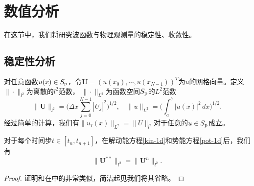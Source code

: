 

\section{数值分析} 
在这节中，我们将研究波函数与物理观测量的稳定性、收敛性。
\subsection{稳定性分析}
对任意函数$u(x) \in  S_{\rm p}$，令$\mathbf{U}=(u(x_0),\cdots,u(x_{N-1}))^T$为$u$的网格向量。定义$\|\cdot\|_{l^2}$为离散的$l^2$范数，
 $\|\cdot\|_{L^2}$为函数空间$S_{\rm p}$的$L^2$范数
\begin{equation}
\|\mathbf{U}\|_{l^2}= \Big(\Delta x \sum_{j=0}^{N-1}|U_j|^2\Big)^{1/2},\quad\|u\|_{L^2}=\Big(\int_a^b |u(x)|^2\,dx\Big)^{1/2}.
\end{equation}
经过简单的计算，我们有$\|u_I(x)\|_{L^2}=\|U\|_{l^2}$对于任意的$u \in S_{\rm p}$成立。

\begin{lem}\label{kin-pot-stab}
	对于每个时间步$t\in[t_n,t_{n+1}]$，在解动能方程\eqref{kin-1d}和势能方程\eqref{pot-1d}后，我们有
	\begin{equation}
	\|\mathbf{U}^{**}\|_{l^2}=\|\mathbf{U}^n\|_{l^2}.
	\end{equation}
\end{lem}

\begin{proof}
证明和在中的非常类似，简洁起见我们将其省略。
\end{proof}


